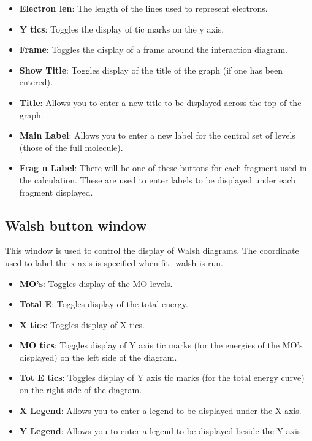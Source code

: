 \begin{itemize}
\item {\bf Electron len}: The length of the lines used to represent
electrons.

\item {\bf Y tics}: Toggles the display of tic marks on the y axis.

\item {\bf Frame}: Toggles the display of a frame around the
interaction diagram.

\item {\bf Show Title}: Toggles display of the title of the graph (if
one has been entered).

\item {\bf Title}: Allows you to enter a new title to be displayed
across the top of the graph.

\item {\bf Main Label}: Allows you to enter a new label for the
central set of levels (those of the full molecule).

\item {\bf Frag {\sf n} Label}: There will be one of these buttons for
each fragment used in the calculation.  These are used to enter labels
to be displayed under each fragment displayed.

\end{itemize}

\subsection{Walsh button window}

This window is used to control the display of Walsh diagrams.  The
coordinate used to label the x axis is specified when {\sf fit\_walsh}
is run.

\begin{itemize}

\item {\bf MO's}: Toggles display of the MO levels.

\item {\bf Total E}: Toggles display of the total energy.

\item {\bf X tics}: Toggles display of X tics.

\item {\bf MO tics}: Toggles display of Y axis tic marks (for the
energies of the MO's displayed) on the left side of the diagram.

\item {\bf Tot E tics}: Toggles display of Y axis tic marks (for the
total energy curve) on the right side of the diagram.

\item {\bf X Legend}: Allows you to enter a legend to be displayed
under the X axis.

\item {\bf Y Legend}: Allows you to enter a legend to be displayed
beside the Y axis.
\end{itemize}

